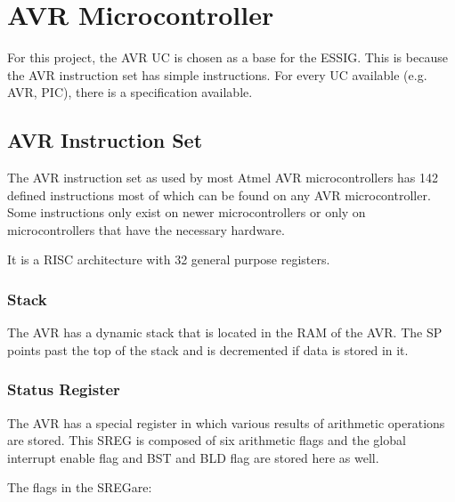 \chapter{AVR Microcontroller}
For this project, the AVR \ac{UC} is chosen as a base for the \ac{ESSIG}. This
is because the AVR instruction set has simple instructions. For every \ac{UC}
available (e.g. AVR, PIC), there is a specification available.
 
%

\section{AVR Instruction Set}

The AVR instruction set\cite{atmelISA} as used by most Atmel AVR microcontrollers has 142 
defined instructions most of which can be found on any AVR microcontroller.
Some instructions only exist on newer microcontrollers or only on 
microcontrollers that have the necessary hardware.

It is a RISC architecture with 32 general purpose registers. 

\subsection{Stack}

The AVR has a dynamic stack that is located in the RAM of the AVR.
The \ac{SP} points past the top of the stack and is decremented if data is 
stored in it.

\subsection{Status Register}

The AVR has a special register\cite[p.1]{atmelISA} in which various results of arithmetic
operations are stored. This \ac{SREG} is composed of six arithmetic
flags and the global interrupt enable flag and BST and BLD flag are 
stored here as well.

The flags in the \ac{SREG}\cite[p.1]{atmelISA}\cite[p.9-10]{ATMegaDS}are:

